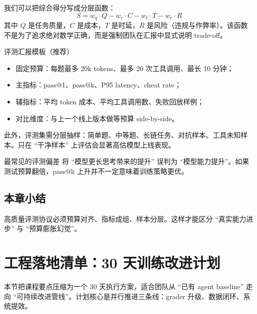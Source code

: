 \documentclass[a4paper]{article}
\begin{document}
我们可以把综合得分写成分层函数：
\[
S = w_q \cdot Q - w_c \cdot C - w_t \cdot T - w_r \cdot R
\]
其中 \(Q\) 是任务质量，\(C\) 是成本，\(T\) 是时延，\(R\) 是风险（违规与作弊率）。该函数不是为了追求绝对数学正确，而是强制团队在汇报中显式说明 trade-off。

\begin{knowledgebox}{评测汇报模板（推荐）}
\begin{itemize}
    \item 固定预算：每题最多 20k tokens、最多 20 次工具调用、最长 10 分钟；
    \item 主指标：pass@1、pass@k、P95 latency、cheat rate；
    \item 辅指标：平均 token 成本、平均工具调用数、失败回放样例；
    \item 对比维度：与上一个线上版本做等预算 side-by-side。
\end{itemize}
\end{knowledgebox}

此外，评测集需分层抽样：简单题、中等题、长链任务、对抗样本、工具未知样本。只在 ``干净样本'' 上评估会显著高估模型上线表现。

\begin{warningbox}{最常见的评测偏差}
将 ``模型更长思考带来的提升'' 误判为 ``模型能力提升''。如果测试预算翻倍，pass@k 上升并不一定意味着训练策略更优。
\end{warningbox}

\subsection{本章小结}
高质量评测协议必须预算对齐、指标成组、样本分层。这样才能区分 ``真实能力进步'' 与 ``预算膨胀幻觉''。

\section{工程落地清单：30 天训练改进计划}

本节把课程要点压缩为一个 30 天执行方案，适合团队从 ``已有 agent baseline'' 走向 ``可持续改进管线''。计划核心是并行推进三条线：grader 升级、数据闭环、系统提效。
\end{document}
